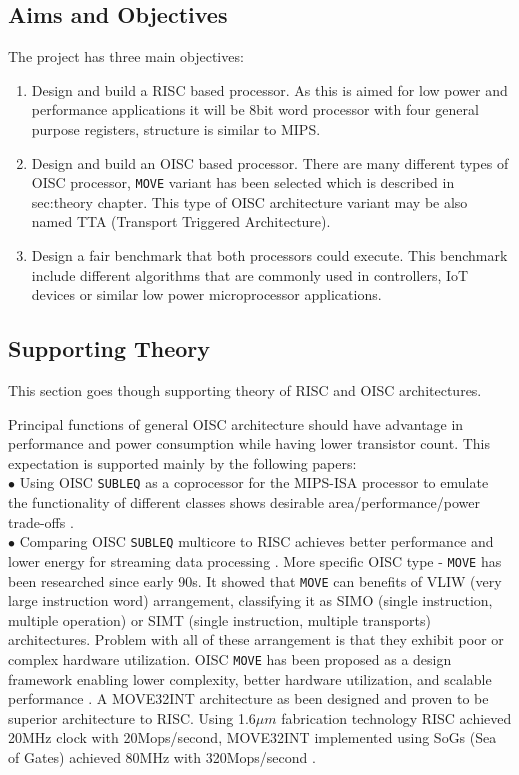 \subsection{Aims and Objectives}

The project has three main objectives:
\begin{enumerate}
	\item Design and build a RISC based processor. As this is aimed for low power and performance applications it will be 8bit word processor with four general purpose registers, structure is similar to MIPS.
	\item Design and build an OISC based processor. There are many different types of OISC processor, \texttt{MOVE} variant has been selected which is described in \refname{sec:theory} chapter. This type of OISC architecture variant may be also named TTA (Transport Triggered Architecture). 
	\item Design a fair benchmark that both processors could execute. This benchmark include different algorithms that are commonly used in controllers, IoT devices or similar low power microprocessor applications.
\end{enumerate}

\subsection{Supporting Theory}
This section goes though supporting theory of RISC and OISC architectures.

Principal functions of general OISC architecture should have advantage in performance and power consumption while having lower transistor count. This expectation is supported mainly by the following papers:\\
$\bullet$ Using OISC \texttt{SUBLEQ} as a coprocessor for the MIPS-ISA processor to emulate the functionality of different classes shows desirable area/performance/power trade-offs \autocite{ahmed_sakamoto_anderson_hara-azumi_2015}.\\
$\bullet$ Comparing OISC \texttt{SUBLEQ} multicore to RISC achieves better performance and lower energy for streaming data processing \autocite{yokota_saso_hara-azumi_2017}.
More specific OISC type - \texttt{MOVE} has been researched since early 90s. It showed that \texttt{MOVE} can benefits of VLIW (very large instruction word) arrangement, classifying it as SIMO (single instruction, multiple operation) or SIMT (single instruction, multiple transports) architectures. Problem with all of these arrangement is that they exhibit poor or complex hardware utilization. OISC \texttt{MOVE} has been proposed as a design framework enabling lower complexity, better hardware utilization, and scalable performance \autocite{5348869}. A MOVE32INT architecture as been designed \autocite{Corporaal94move32int} and proven to be superior architecture to RISC. Using 1.6$\mu m$ fabrication technology RISC achieved 20MHz clock with 20Mops/second, MOVE32INT implemented using SoGs (Sea of Gates) achieved 80MHz with 320Mops/second \autocite{289981}.

